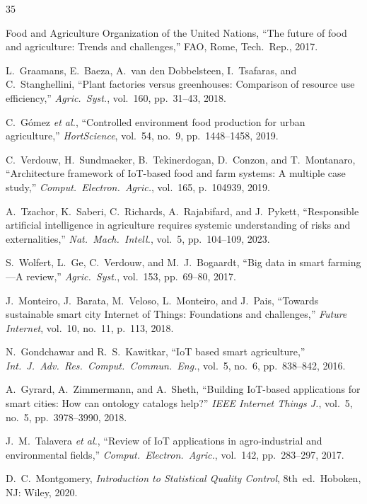 \documentclass[journal,10pt,twocolumn]{IEEEtran}
\begin{document}
\begin{thebibliography}{35}

{Food and Agriculture Organization of the United Nations},
``The future of food and agriculture: Trends and challenges,''
FAO, Rome, Tech.\ Rep., 2017.

L.~Graamans, E.~Baeza, A.~van den Dobbelsteen, I.~Tsafaras, and
C.~Stanghellini, ``Plant factories versus greenhouses: Comparison of
resource use efficiency,'' \emph{Agric.\ Syst.}, vol.~160,
pp.~31--43, 2018.

C.~Gómez \emph{et al.}, ``Controlled environment food production for
urban agriculture,'' \emph{HortScience}, vol.~54, no.~9,
pp.~1448--1458, 2019.

C.~Verdouw, H.~Sundmaeker, B.~Tekinerdogan, D.~Conzon, and
T.~Montanaro, ``Architecture framework of IoT-based food and farm
systems: A multiple case study,'' \emph{Comput.\ Electron.\ Agric.},
vol.~165, p.~104939, 2019.

A.~Tzachor, K.~Saberi, C.~Richards, A.~Rajabifard, and J.~Pykett,
``Responsible artificial intelligence in agriculture requires systemic
understanding of risks and externalities,'' \emph{Nat.\ Mach.\
Intell.}, vol.~5, pp.~104--109, 2023.

S.~Wolfert, L.~Ge, C.~Verdouw, and M.~J.~Bogaardt, ``Big data in
smart farming---A review,'' \emph{Agric.\ Syst.}, vol.~153,
pp.~69--80, 2017.

J.~Monteiro, J.~Barata, M.~Veloso, L.~Monteiro, and J.~Pais,
``Towards sustainable smart city Internet of Things: Foundations and
challenges,'' \emph{Future Internet}, vol.~10, no.~11, p.~113, 2018.

N.~Gondchawar and R.~S.~Kawitkar, ``IoT based smart agriculture,''
\emph{Int.\ J.\ Adv.\ Res.\ Comput.\ Commun.\ Eng.}, vol.~5, no.~6,
pp.~838--842, 2016.

A.~Gyrard, A.~Zimmermann, and A.~Sheth, ``Building IoT-based
applications for smart cities: How can ontology catalogs help?''
\emph{IEEE Internet Things J.}, vol.~5, no.~5,
pp.~3978--3990, 2018.

J.~M.~Talavera \emph{et al.}, ``Review of IoT applications in
agro-industrial and environmental fields,'' \emph{Comput.\ Electron.\
Agric.}, vol.~142, pp.~283--297, 2017.

D.~C.~Montgomery, \emph{Introduction to Statistical Quality Control},
8th~ed.\ Hoboken, NJ: Wiley, 2020.


\end{thebibliography}
\end{document}
